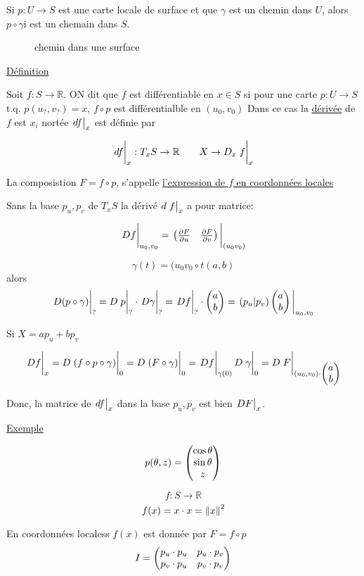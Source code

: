 Si $p:U\to S$ est une carte locale de surface et que $\gamma$ est un chemin dans $U$, alors $p \circ \gamma$i est un chemain dans $S$.   


\begin{figure}[ht]
    \centering
    \caption{chemin dans une surface}
    \label{fig:chemin-dans-une-surface}
\end{figure}


\underline{Définition} 

Soit $f: S\to \mathbb{R}$. ON dit que $f$ est différentiable en $x\in S$ si pour une carte $p: U \to S$ t.q. $p(u_?,v_?) =x$, $f\circ p$ est différentialble en $(u_{0},v_{0})$     
Dans ce cas la \underline{dérivée} de $f$ est $x_{i}$ nortée $\eval{df}_x$ est définie par

$$\eval{df}_x: T_{x}S \to \mathbb{R}\qquad X\to D_x\eval{f}_x$$ 


La composistion $F=f\circ p$, s'appelle \underline{l'expression de $f$ en coordonnées locales}  

Sans la base $p_{u},p_{v}$ de $T_{x}S$ la dérivé $d\eval{f}_x$ a pour matrice:

$$\eval{Df}_{u_{0}, v_{0}} = \eval{\cols{\pdv{F}{u} & \pdv{F}{v}}}_{(u_{0}v_{0})}$$ 

$$\gamma(t) = (u_{0}v_{0}\circ t(a,b)$$ 
alors $$\eval{D(p\circ \gamma)}_? = D\eval{p}_?\cdot\eval{D\gamma}_? = \eval{Df}_? \cdot \cols{a\\ b} = \eval{(p_u|p_v) \cols{a\\b}}_{u_{0}, v_{0}}$$ 


Si $X =a p_{u}+ bp_{v}$ 

$$\eval{Df}_x = D\eval{\qty(f \circ p \circ\gamma)}_0 = D\eval{\qty(F\circ \gamma)}_0 = \eval{Df}_{\gamma(0)} D\eval{\gamma}_0 = D\eval{F}_{(u_{0},v_{0}) \cdot \cols{a\\b}}$$ 

Donc, la matrice de $\eval{df}_x$ dans la base $p_{u}, p_{v}$ est bien $\eval{DF}_x$.   


\underline{Exemple} 


$$p(\theta, z) = \begin{pmatrix} \cos\theta\\\sin\theta\\z \end{pmatrix}$$ 

$$f: S \to \mathbb{R}$$ 
$$f(x) = x\cdot x = \norm{x}^2$$ 


En coordonnées localess $f(x)$ est donnée par $F = f\circ p$   
$$I = \begin{pmatrix} p_{u}\cdot p_{u} & p_{u}\cdot p_{v}\\ p_{v}\cdot p_{u}& p_{v}\cdot p_{v} \end{pmatrix}$$ 


